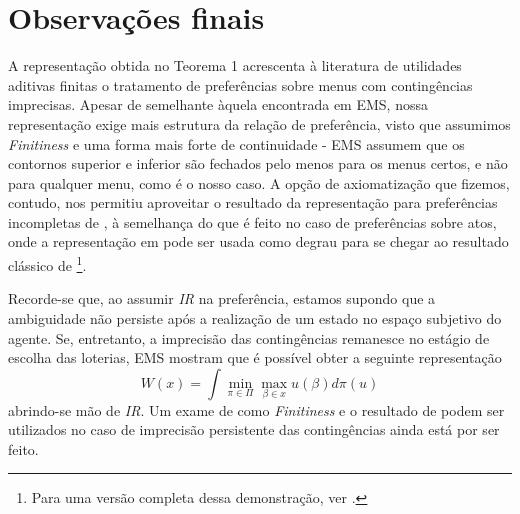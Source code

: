 \documentclass[12pt, a4paper]{article}
\theoremstyle{nonumberplain}
\theoremstyle{plain}
\theoremstyle{plain}
\theoremstyle{plain}
\theoremstyle{nonumberplain}
\begin{document}
\section{Observações finais}
A representação obtida no Teorema 1 acrescenta à literatura de utilidades aditivas finitas o tratamento de preferências sobre menus com contingências imprecisas. Apesar de semelhante àquela encontrada em EMS, nossa representação exige mais estrutura da relação de preferência, visto que assumimos \emph{Finitiness} e uma forma mais forte de continuidade - EMS assumem que os contornos superior e inferior são fechados pelo menos para os menus certos, e não para qualquer menu, como é o nosso caso. A opção de axiomatização que fizemos, contudo, nos permitiu aproveitar o resultado da representação para preferências incompletas de \cite{Kochov2007}, à semelhança do que é feito no caso de preferências sobre atos, onde a representação em \cite{Bewley1986a} pode ser usada como degrau para se chegar ao resultado clássico de \cite{Gilboa1989}\footnote{Para uma versão completa dessa demonstração, ver \cite{Riella2014}.}.

Recorde-se que, ao assumir \emph{IR} na preferência, estamos supondo que a ambiguidade não persiste após a realização de um estado no espaço subjetivo do agente. Se, entretanto, a imprecisão das contingências remanesce no estágio de escolha das loterias, EMS mostram que é possível obter a seguinte representação
$$W(x)=\int \min_{\pi\in\Pi} \max_{\beta\in x}u(\beta)d\pi(u) $$
abrindo-se mão de \emph{IR}. Um exame de como \emph{Finitiness} e o resultado de \cite{Kochov2007} podem ser utilizados no caso de imprecisão persistente das contingências ainda está por ser feito.
\clearpage



\end{document}
